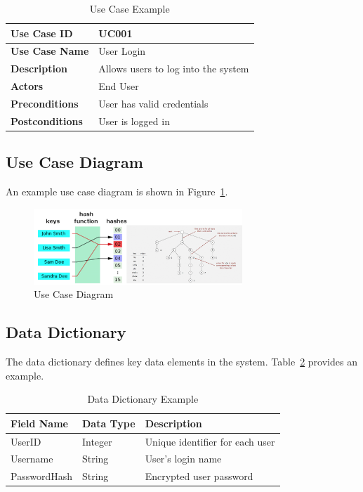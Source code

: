 \begin{table}[h]
    \centering
    \begin{tabular}{|l|l|}
        \hline
        \textbf{Use Case ID} & UC001 \\ \hline
        \textbf{Use Case Name} & User Login \\ \hline
        \textbf{Description} & Allows users to log into the system \\ \hline
        \textbf{Actors} & End User \\ \hline
        \textbf{Preconditions} & User has valid credentials \\ \hline
        \textbf{Postconditions} & User is logged in \\ \hline
    \end{tabular}
    \caption{Use Case Example}
    \label{tab:use_case}
\end{table}

\subsection{Use Case Diagram}
An example use case diagram is shown in Figure~\ref{fig:use_case_diagram}.

\begin{figure}[h]
    \centering
    \includegraphics[width=0.7\textwidth]{images/hashing.png}
    \caption{Use Case Diagram}
    \label{fig:use_case_diagram}
\end{figure}

\subsection{Data Dictionary}
The data dictionary defines key data elements in the system. Table~\ref{tab:data_dictionary} provides an example.

\begin{table}[h]
    \centering
    \begin{tabular}{|l|l|l|}
        \hline
        \textbf{Field Name} & \textbf{Data Type} & \textbf{Description} \\ \hline
        UserID & Integer & Unique identifier for each user \\ \hline
        Username & String & User's login name \\ \hline
        PasswordHash & String & Encrypted user password \\ \hline
    \end{tabular}
    \caption{Data Dictionary Example}
    \label{tab:data_dictionary}
\end{table}

